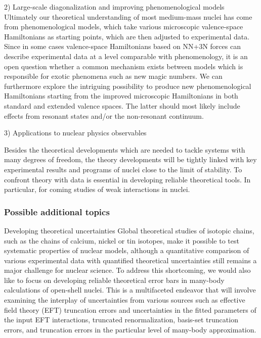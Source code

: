 \documentclass{beamer}
\begin{document}
\begin{frame}
\begin{block}{2) Large-scale diagonalization and improving phenomenological models  }
Ultimately our theoretical understanding of most medium-mass nuclei has come 
from phenomenological models, which take various microscopic valence-space 
Hamiltonians as starting points, which are then adjusted to experimental data.  Since in some cases valence-space Hamiltonians based on NN+3N forces can describe experimental 
data at a level comparable with phenomenology, it is an open question whether a 
common mechanism exists between models which is responsible for exotic 
phenomena such as new magic numbers.  We can furthermore explore the 
intriguing possibility to produce new phenomenological Hamiltonians starting from 
the improved microscopic Hamiltonians in both standard and 
extended valence spaces. The latter should most likely include effects from resonant states and/or the non-resonant continuum.
\end{block}

\begin{block}{3) Applications to nuclear physics observables }

Besides the theoretical developments which are needed to tackle systems with many degrees of freedom, the theory developments  will be tightly linked with key experimental results and programs of nuclei close to the limit of stability. 
To confront theory with data is essential in developing reliable theoretical tools. In particular, for coming studies 
of weak interactions in nuclei.

\end{block}
\end{frame}

\begin{frame}
\frametitle{Possible additional topics}

\begin{block}{Developing theoretical uncertainties }
Global theoretical
studies of isotopic chains, such as the chains of calcium, nickel or
tin isotopes, make it possible to test systematic properties of
nuclear models, although a quantitative
comparison of various experimental data with quantified theoretical
uncertainties still remains a major challenge for nuclear science. To
address this shortcoming, we would also like to 
focus on developing reliable theoretical error bars in many-body
calculations of open-shell nuclei. This is a multifaceted endeavor that will involve examining the interplay of uncertainties from various sources
such as effective field theory (EFT) truncation errors and uncertainties in the
fitted parameters of the input EFT interactions, truncated renormalization, basis-set
truncation errors, and truncation errors in the particular level of
many-body approximation. 
\end{block}
\end{frame}
\end{document}

